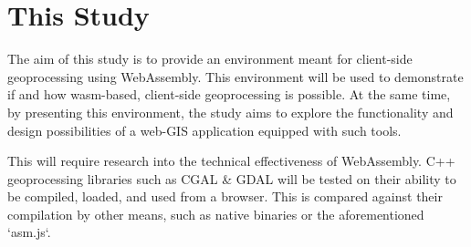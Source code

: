 % 
% 
% 
% 
% 
\newpage
\section{This Study}

The aim of this study is to provide an environment meant for client-side geoprocessing using WebAssembly. 
This environment will be used to demonstrate if and how wasm-based, client-side geoprocessing is possible. 
At the same time, by presenting this environment, the study aims to explore the functionality and design possibilities of a web-GIS application equipped with such tools. 

This will require research into the technical effectiveness of WebAssembly. 
C++ geoprocessing libraries such as CGAL \& GDAL will be tested on their ability to be compiled, loaded, and used from a browser. 
This is compared against their compilation by other means, such as native binaries or the aforementioned `asm.js`. 

